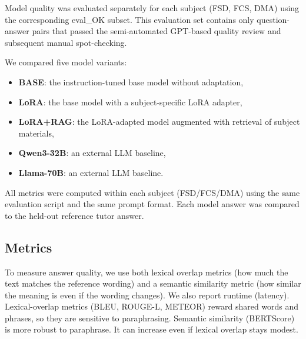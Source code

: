 Model quality was evaluated separately for each subject (FSD, FCS, DMA) using the corresponding eval\_OK subset. This evaluation set contains only question-answer pairs that passed the semi-automated GPT-based quality review and subsequent manual spot-checking.

We compared five model variants:
\begin{itemize}
    \item \textbf{BASE}: the instruction-tuned base model without adaptation,
    \item \textbf{LoRA}: the base model with a subject-specific LoRA adapter,
    \item \textbf{LoRA+RAG}: the LoRA-adapted model augmented with retrieval of subject materials,
    \item \textbf{Qwen3-32B}: an external LLM baseline,
    \item \textbf{Llama-70B}: an external LLM baseline.
\end{itemize}

All metrics were computed within each subject (FSD/FCS/DMA) using the same evaluation script and the same prompt format. Each model answer was compared to the held-out reference tutor answer.

\subsection{Metrics}
To measure answer quality, we use both lexical overlap metrics (how much the text matches the reference wording) and a semantic similarity metric (how similar the meaning is even if the wording changes). We also report runtime (latency). Lexical-overlap metrics (BLEU, ROUGE-L, METEOR) reward shared words and phrases, so they are sensitive to paraphrasing. Semantic similarity (BERTScore) is more robust to paraphrase. It can increase even if lexical overlap stays modest.

\begin{table}[h]
\centering
\caption{Metric units and value ranges used in this evaluation.}
\label{tab:metric-units-ranges}
\small
{}
\end{table}
\FloatBarrier

